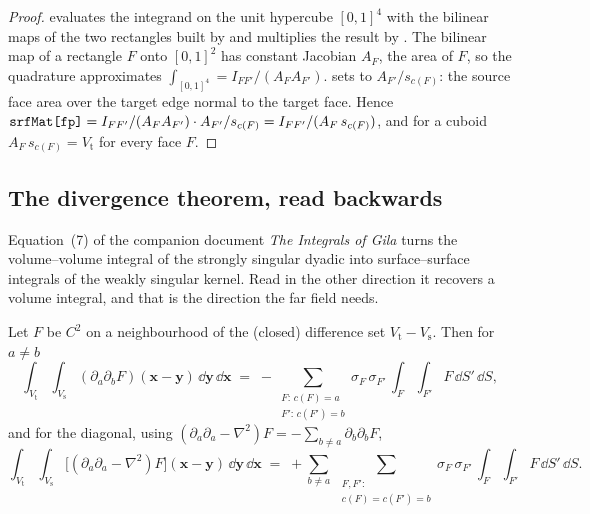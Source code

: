 \begin{proof}
 evaluates the integrand on the unit hypercube $[0,1]^4$ with the
bilinear maps of the two rectangles built by  and multiplies the result by
. The bilinear map of a rectangle $F$ onto $[0,1]^2$ has constant
Jacobian $A_F$, the area of $F$, so the quadrature approximates
$\int_{[0,1]^4} = I_{FF'}/(A_F A_{F'})$.  sets
 to $A_{F'}/s_{c(F)}$: the source face area over the
target edge normal to the target face. Hence
$\texttt{srfMat[fp]} = I_{FF'}/(A_F A_{F'}) \cdot A_{F'}/s_{c(F)} = I_{FF'}/(A_F\,s_{c(F)})$,
and for a cuboid $A_F\, s_{c(F)} = V_{\mathrm{t}}$ for every face $F$.
\end{proof}

\subsection{The divergence theorem, read backwards}
\label{sec:vol:div}

Equation~(7) of the companion document \emph{The Integrals of Gila} turns the
volume--volume integral of the strongly singular dyadic into surface--surface integrals of
the weakly singular kernel. Read in the other direction it recovers a volume integral,
and that is the direction the far field needs.

\begin{lemma}
\label{lem:vol:div}
Let $F$ be $C^2$ on a neighbourhood of the (closed) difference set
$V_{\mathrm{t}} - V_{\mathrm{s}}$. Then for $a \neq b$
\begin{equation}
\int_{V_{\mathrm{t}}}\!\int_{V_{\mathrm{s}}}
(\partial_a \partial_b F)(\mathbf{x}-\mathbf{y})\,\dd\mathbf{y}\,\dd\mathbf{x}
\;=\; -\sum_{\substack{F:\,c(F)=a\\ F':\,c(F')=b}} \sigma_F\,\sigma_{F'}\,
\int_F\!\int_{F'} F\,\dd S'\,\dd S ,
\label{eq:vol:divoff}
\end{equation}
and for the diagonal, using
$(\partial_a\partial_a - \nabla^2)F = -\sum_{b \neq a}\partial_b\partial_b F$,
\begin{equation}
\int_{V_{\mathrm{t}}}\!\int_{V_{\mathrm{s}}}
\bigl[(\partial_a \partial_a - \nabla^2) F\bigr](\mathbf{x}-\mathbf{y})\,
\dd\mathbf{y}\,\dd\mathbf{x}
\;=\; +\sum_{b \neq a}\ \sum_{\substack{F,F':\\ c(F)=c(F')=b}} \sigma_F\,\sigma_{F'}\,
\int_F\!\int_{F'} F\,\dd S'\,\dd S .
\label{eq:vol:divdia}
\end{equation}
\end{lemma}

